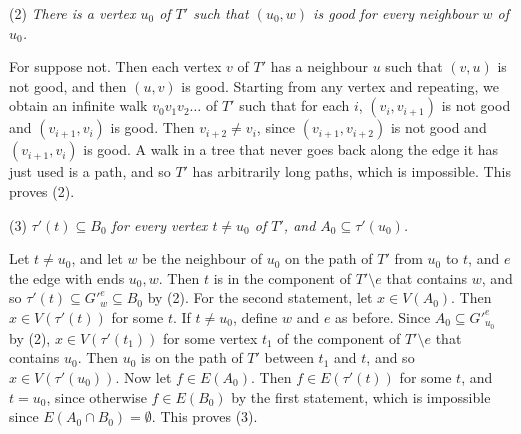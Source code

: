 {\hspace*{12pt}(2) \textit{There is a vertex $u_0$ of $T'$ such that $(u_0, w)$ is good for every neighbour $w$ of $u_0$.}

For suppose not. Then each vertex $v$ of $T'$ has a neighbour $u$ such that $(v, u)$ is not good, and then $(u, v)$ is good. Starting from any vertex and repeating, we obtain an infinite walk $v_0 v_1 v_2 \dots$ of $T'$ such that for each $i$, $(v_i, v_{i+1})$ is not good and $(v_{i+1}, v_i)$ is good. Then $v_{i+2} \ne v_i$, since $(v_{i+1}, v_{i+2})$ is not good and $(v_{i+1}, v_i)$ is good. A walk in a tree that never goes back along the edge it has just used is a path, and so $T'$ has arbitrarily long paths, which is impossible. This proves (2).

\hspace*{12pt}(3) \textit{$\tau'(t) \subseteq B_0$ for every vertex $t \ne u_0$ of $T'$, and $A_0 \subseteq \tau'(u_0)$.}

Let $t \ne u_0$, and let $w$ be the neighbour of $u_0$ on the path of $T'$ from $u_0$ to $t$, and $e$ the edge with ends $u_0, w$. Then $t$ is in the component of $T' \setminus e$ that contains $w$, and so $\tau'(t) \subseteq G'^e_w \subseteq B_0$ by (2). For the second statement, let $x \in V(A_0)$. Then $x \in V(\tau'(t))$ for some $t$. If $t \ne u_0$, define $w$ and $e$ as before. Since $A_0 \subseteq G'^e_{u_0}$ by (2), $x \in V(\tau'(t_1))$ for some vertex $t_1$ of the component of $T' \setminus e$ that contains $u_0$. Then $u_0$ is on the path of $T'$ between $t_1$ and $t$, and so $x \in V(\tau'(u_0))$. Now let $f \in E(A_0)$. Then $f \in E(\tau'(t))$ for some $t$, and $t = u_0$, since otherwise $f \in E(B_0)$ by the first statement, which is impossible since $E(A_0 \cap B_0) = \emptyset$. This proves (3).

}

